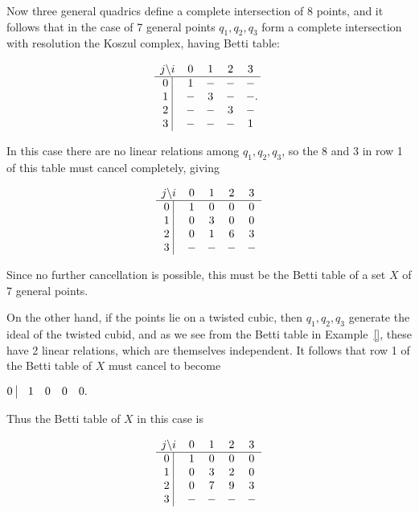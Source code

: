 \begin{example}
Now three general quadrics define a complete intersection of 8 points, and it follows that in the case of 7 general points $q_{1},q_{2},q_{3}$ form a complete intersection with resolution the Koszul complex, having Betti table:
\begin{small}
$$
\begin{matrix}
j \backslash i &0&1&2&3\\ \hline
\text{0 }\vline &1&-&-&-\\
\text{1 }\vline &-&3&-&-\\
\text{2 }\vline &-&-&3&-\\
\text{3 }\vline &-&-&-&1\\
\end{matrix}.
$$
\end{small}
In this case there are no linear relations among $q_{1},q_{2},q_{3}$, so the 8 and 3 in row 1 of this table must 
cancel completely, giving
\begin{small}
$$
\begin{matrix}
j \backslash i &0&1&2&3\\ \hline
\text{0 }\vline &1&0&0&0\\
\text{1 }\vline &0&3&0&0\\
\text{2 }\vline &0&1&6&3\\
\text{3 }\vline &-&-&-&-\\
\end{matrix}
$$
\end{small}
Since no further cancellation is possible, this must be the Betti table of a  set $X$ of 7 general points.

On the other hand, if the points lie on a twisted cubic, then $q_{1}, q_{2}, q_{3}$ generate the ideal of the twisted cubid, and as we  see from the Betti table in Example~\ref{}, these have 2 linear relations, which are themselves independent. It follows that row 1 of the Betti table of $X$ must cancel to become 
\begin{small}
 $
\begin{matrix}
\text{0 }\vline &1&0&0&0\\
\end{matrix}.
$
\end{small}
Thus the Betti table of $X$ in this case is
\begin{small}
$$
\begin{matrix}
j \backslash i &0&1&2&3\\ \hline
\text{0 }\vline &1&0&0&0\\
\text{1 }\vline &0&3&2&0\\
\text{2 }\vline &0&7&9&3\\
\text{3 }\vline &-&-&-&-\\
\end{matrix}
$$
\end{small}

\end{example}


